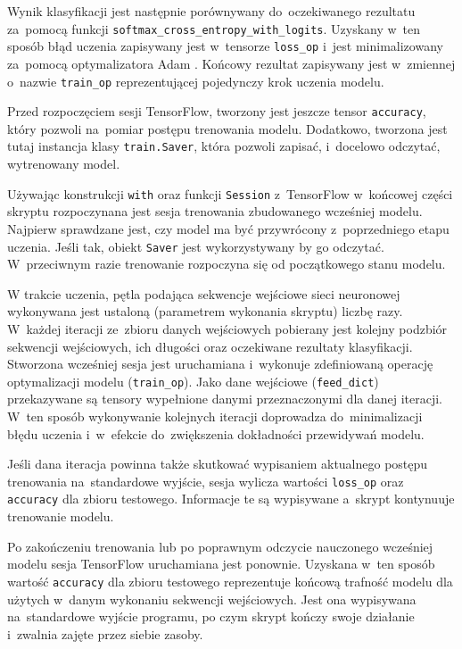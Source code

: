 \documentclass[twoside]{praca}
\begin{document}
Wynik klasyfikacji jest następnie porównywany do~oczekiwanego rezultatu za~pomocą funkcji \texttt{softmax\_cross\_entropy\_with\_logits}. Uzyskany w~ten sposób błąd uczenia zapisywany jest w~tensorze \texttt{loss\_op} i~jest minimalizowany za~pomocą optymalizatora Adam \cite{kingma2014adam}.
Końcowy rezultat zapisywany jest w~zmiennej o~nazwie \texttt{train\_op} reprezentującej pojedynczy krok uczenia modelu.

Przed rozpoczęciem sesji TensorFlow, tworzony jest jeszcze tensor \texttt{accuracy}, który pozwoli na~pomiar postępu trenowania modelu. Dodatkowo, tworzona jest tutaj instancja klasy \texttt{train.Saver}, która pozwoli zapisać, i~docelowo odczytać, wytrenowany model.

Używając konstrukcji \texttt{with} oraz funkcji \texttt{Session} z~TensorFlow w~końcowej części skryptu rozpoczynana jest sesja trenowania zbudowanego wcześniej modelu. Najpierw sprawdzane jest, czy model ma być przywrócony z~poprzedniego etapu uczenia. Jeśli tak, obiekt \texttt{Saver} jest wykorzystywany by go odczytać. W~przeciwnym razie trenowanie rozpoczyna się od początkowego stanu modelu.

W trakcie uczenia, pętla podająca sekwencje wejściowe sieci neuronowej wykonywana jest ustaloną (parametrem wykonania skryptu) liczbę razy. W~każdej iteracji ze~zbioru danych wejściowych pobierany jest kolejny podzbiór sekwencji wejściowych, ich długości oraz oczekiwane rezultaty klasyfikacji. Stworzona wcześniej sesja jest uruchamiana i~wykonuje zdefiniowaną operację optymalizacji modelu (\texttt{train\_op}). Jako dane wejściowe (\texttt{feed\_dict}) przekazywane są tensory wypełnione danymi przeznaczonymi dla danej iteracji. W~ten sposób wykonywanie kolejnych iteracji doprowadza do~minimalizacji błędu uczenia i~w~efekcie do~zwiększenia dokładności przewidywań modelu.

Jeśli dana iteracja powinna także skutkować wypisaniem aktualnego postępu trenowania na~standardowe wyjście, sesja wylicza wartości \texttt{loss\_op} oraz \texttt{accuracy} dla zbioru testowego.
Informacje te są wypisywane a~skrypt kontynuuje trenowanie modelu.

Po zakończeniu trenowania lub po poprawnym odczycie nauczonego wcześniej modelu sesja TensorFlow uruchamiana jest ponownie. Uzyskana w~ten sposób wartość \texttt{accuracy} dla zbioru testowego reprezentuje końcową trafność modelu dla użytych w~danym wykonaniu sekwencji wejściowych. Jest ona wypisywana na~standardowe wyjście programu, po czym skrypt kończy swoje działanie i~zwalnia zajęte przez siebie zasoby.
\end{document}
